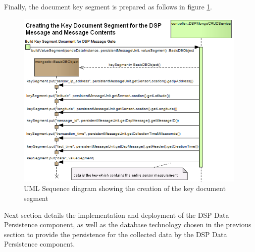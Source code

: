Finally, the document key segment is prepared as follows in figure
\ref{fig:From-Creating-Key-Segment-Sequence}.

\begin{figure}[!b]
  \centering
  \includegraphics[scale=0.5]{../diagrams/From-Creating-Key-Segment-Sequence}
  \caption{UML Sequence diagram showing the creation of the key document segment}
  \label{fig:From-Creating-Key-Segment-Sequence}
\end{figure}

Next section details the implementation and deployment of the DSP Data
Persistence component, as well as the database technology chosen in the previous
section to provide the persistence for the collected data by the DSP Data
Persistence component.